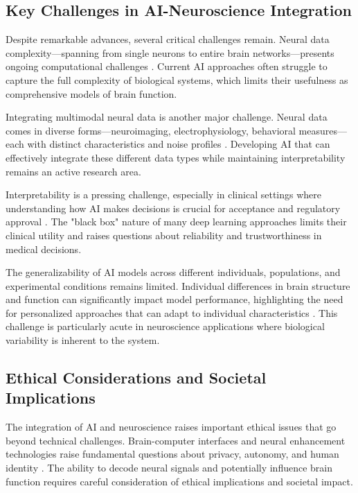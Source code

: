 \documentclass[conference]{IEEEtran}
\begin{document}
\subsection{Key Challenges in AI-Neuroscience Integration}

Despite remarkable advances, several critical challenges remain. Neural data complexity—spanning from single neurons to entire brain networks—presents ongoing computational challenges \citep{onciulArtificialIntelligenceNeuroscience2025}. Current AI approaches often struggle to capture the full complexity of biological systems, which limits their usefulness as comprehensive models of brain function.

Integrating multimodal neural data is another major challenge. Neural data comes in diverse forms—neuroimaging, electrophysiology, behavioral measures—each with distinct characteristics and noise profiles \citep{lorenziIntegrationMultimodalData2023}. Developing AI that can effectively integrate these different data types while maintaining interpretability remains an active research area.

Interpretability is a pressing challenge, especially in clinical settings where understanding how AI makes decisions is crucial for acceptance and regulatory approval \citep{sadeghiReviewExplainableArtificial2024}. The "black box" nature of many deep learning approaches limits their clinical utility and raises questions about reliability and trustworthiness in medical decisions.

The generalizability of AI models across different individuals, populations, and experimental conditions remains limited. Individual differences in brain structure and function can significantly impact model performance, highlighting the need for personalized approaches that can adapt to individual characteristics \citep{johnsonPrecisionMedicineAI2021}. This challenge is particularly acute in neuroscience applications where biological variability is inherent to the system.

\subsection{Ethical Considerations and Societal Implications}

The integration of AI and neuroscience raises important ethical issues that go beyond technical challenges. Brain-computer interfaces and neural enhancement technologies raise fundamental questions about privacy, autonomy, and human identity \citep{gordonEthicalConsiderationsUse2024}. The ability to decode neural signals and potentially influence brain function requires careful consideration of ethical implications and societal impact.
\end{document}
